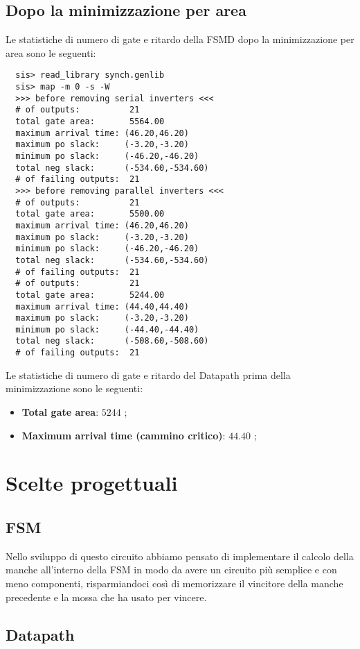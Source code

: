 \documentclass[a4paper]{article}
\begin{document}
\subsection{Dopo la minimizzazione per area}
Le statistiche di numero di gate e ritardo della FSMD dopo la minimizzazione per area sono le seguenti:
\begin{lstlisting}
  sis> read_library synch.genlib
  sis> map -m 0 -s -W
  >>> before removing serial inverters <<<
  # of outputs:          21
  total gate area:       5564.00
  maximum arrival time: (46.20,46.20)
  maximum po slack:     (-3.20,-3.20)
  minimum po slack:     (-46.20,-46.20)
  total neg slack:      (-534.60,-534.60)
  # of failing outputs:  21
  >>> before removing parallel inverters <<<
  # of outputs:          21
  total gate area:       5500.00
  maximum arrival time: (46.20,46.20)
  maximum po slack:     (-3.20,-3.20)
  minimum po slack:     (-46.20,-46.20)
  total neg slack:      (-534.60,-534.60)
  # of failing outputs:  21
  # of outputs:          21
  total gate area:       5244.00
  maximum arrival time: (44.40,44.40)
  maximum po slack:     (-3.20,-3.20)
  minimum po slack:     (-44.40,-44.40)
  total neg slack:      (-508.60,-508.60)
  # of failing outputs:  21
\end{lstlisting}
\noindent Le statistiche di numero di gate e ritardo del Datapath prima della minimizzazione sono le seguenti:
\begin{itemize}
  \item \textbf{Total gate area}: \( 5244 \) ;
  \item \textbf{Maximum arrival time (cammino critico)}: \( 44.40 \) ;
\end{itemize}

\section{Scelte progettuali}
\subsection{FSM}
Nello sviluppo di questo circuito abbiamo pensato di implementare il calcolo della manche all'interno della
FSM in modo da avere un circuito più semplice e con meno componenti, risparmiandoci così di memorizzare il
vincitore della manche precedente e la mossa che ha usato per vincere.

\subsection{Datapath}
\end{document}
